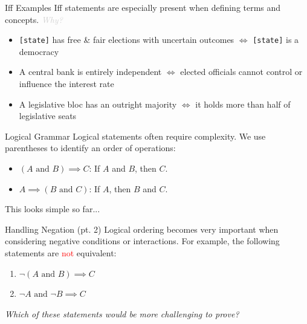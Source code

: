 \documentclass[10pt]{beamer}
\begin{document}
\begin{frame}[fragile]{Iff Examples}
    Iff statements are especially present when defining terms and concepts. \emph{\textcolor{lightgray}{Why?}} 

    \begin{itemize}
        \item \verb|[state]| has free \& fair elections with uncertain outcomes $\iff$ \verb|[state]| is a democracy
        \item A central bank is entirely independent $\iff$ elected officials cannot control or influence the interest rate
        \item A legislative bloc has an outright majority $\iff$ it holds more than half of legislative seats
    \end{itemize}
\end{frame}


\begin{frame}{Logical Grammar}
    Logical statements often require complexity. We use parentheses to identify an order of operations:
    \begin{itemize}
        \item $(A \text{ and } B) \implies C$: If $A$ and $B$, then $C$.
        \item $A \implies (B \text{ and } C)$: If $A$, then $B$ and $C$.
    \end{itemize}
    
    This looks simple so far...
\end{frame}

\begin{frame}{Handling Negation (pt. 2)}
    Logical ordering becomes very important when considering negative conditions or interactions. For example, the following statements are \textcolor{red}{not} equivalent:

    \begin{enumerate}
        \item $\neg (A \text { and } B) \implies C$
        \item $\neg A \text { and } \neg B \implies C$
    \end{enumerate}

    \emph{Which of these statements would be more challenging to prove?}
\end{frame}
\end{document}
